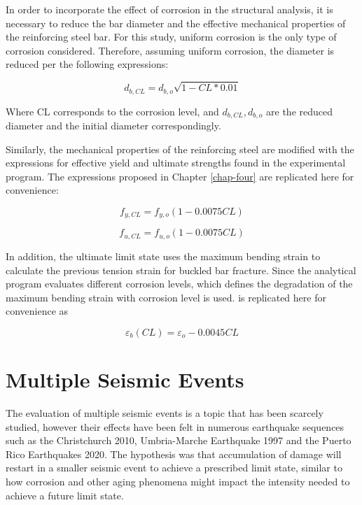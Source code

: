 In order to incorporate the effect of corrosion in the structural analysis, it is necessary to reduce the bar diameter and the effective mechanical properties of the reinforcing steel bar. For this study, uniform corrosion is the only type of corrosion considered. Therefore, assuming uniform corrosion, the diameter is reduced per the following expressions:

\begin{equation}
    d_{b,CL} = d_{b,o} \sqrt{1 - CL*0.01}
    \label{eq:d_eff}
\end{equation}

Where CL corresponds to the corrosion level, and $d_{b,CL}, d_{b,o}$ are the reduced diameter and the initial diameter correspondingly. 

Similarly, the mechanical properties of the reinforcing steel are modified with the expressions for effective yield and ultimate strengths found in the experimental program. The expressions proposed in Chapter \ref{chap-four} are replicated here for convenience:

\begin{equation}
    f_{y,CL} = f_{y,o}(1-0.0075CL)
    \label{eq.Calderon_Fy_vs_CL_5}
\end{equation}

\begin{equation}
    f_{u,CL} = f_{u,o}(1-0.0075CL)
    \label{eq.Calderon_Fu_vs_CL_5}
\end{equation}

In addition, the ultimate limit state uses the maximum bending strain to calculate the previous tension strain for buckled bar fracture. Since the analytical program evaluates different corrosion levels,  which defines the degradation of the maximum bending strain with corrosion level is used.  is replicated here for convenience as 

\begin{equation}
    \varepsilon_{b}(CL) = \varepsilon_{o}-0.0045CL
    \label{eq.Calderon_eb_vs_CL_02}
\end{equation}

\section{Multiple Seismic Events}

The evaluation of multiple seismic events is a topic that has been scarcely studied, however their effects have been felt in numerous earthquake sequences such as the Christchurch 2010, Umbria-Marche Earthquake 1997 and the Puerto Rico Earthquakes 2020. The hypothesis was that accumulation of damage will restart in a smaller seismic event to achieve a prescribed limit state, similar to how corrosion and other aging phenomena might impact the intensity needed to achieve a future limit state. 


